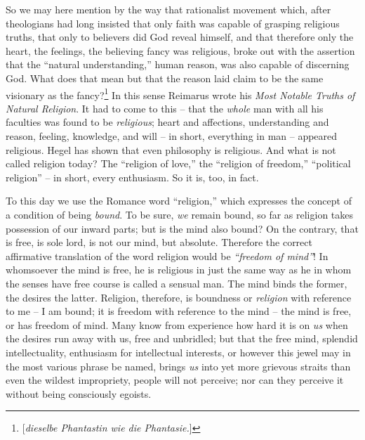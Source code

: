 So we may here mention by the way that rationalist movement which, after 
theologians had long insisted that only faith was capable of grasping 
religious truths, that only to believers did God reveal himself, and that 
therefore only the heart, the feelings, the believing fancy was religious, 
broke out with the assertion that the ``natural understanding,'' human 
reason, was also capable of discerning God. What does that mean but that the 
reason laid claim to be the same visionary as the 
fancy?\footnote{[\textit{dieselbe Phantastin wie die Phantasie.}]} In this 
sense Reimarus wrote his \textit{Most Notable Truths of Natural Religion}. It 
had to come to this -- that the \textit{whole} man with all his faculties was 
found to be \textit{religious}; heart and affections, understanding and 
reason, feeling, knowledge, and will -- in short, everything in man -- 
appeared religious. Hegel has shown that even philosophy is religious. And 
what is not called religion today? The ``religion of love,'' the ``religion 
of freedom,'' ``political religion'' -- in short, every enthusiasm. So it 
is, too, in fact.

To this day we use the Romance word ``religion,'' which expresses the 
concept of a condition of being \textit{bound}. To be sure, \textit{we} remain 
bound, so far as religion takes possession of our inward parts; but is the 
mind also bound? On the contrary, that is free, is sole lord, is not our mind, 
but absolute. Therefore the correct affirmative translation of the word 
religion would be \textit{``freedom of mind''}! In whomsoever the mind is 
free, he is religious in just the same way as he in whom the senses have free 
course is called a sensual man. The mind binds the former, the desires the 
latter. Religion, therefore, is boundness or \textit{religion} with reference 
to me -- I am bound; it is freedom with reference to the mind -- the mind is 
free, or has freedom of mind. Many know from experience how hard it is on 
\textit{us} when the desires run away with us, free and unbridled; but that 
the free mind, splendid intellectuality, enthusiasm for intellectual 
interests, or however this jewel may in the most various phrase be named, 
brings \textit{us} into yet more grievous straits than even the wildest 
impropriety, people will not perceive; nor can they perceive it without being 
consciously egoists.

